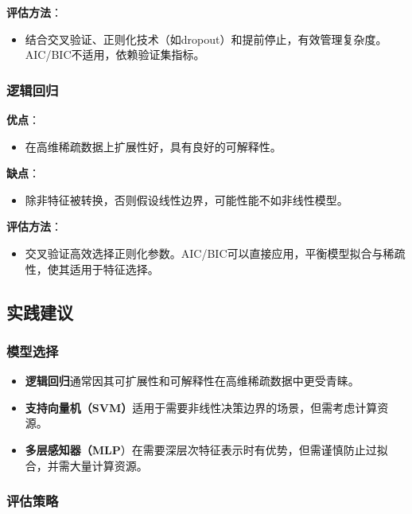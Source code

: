 \documentclass[11pt,a4paper]{article}
\begin{document}
\textbf{评估方法}：
\begin{itemize}
    \item 结合交叉验证、正则化技术（如dropout）和提前停止，有效管理复杂度。AIC/BIC不适用，依赖验证集指标。
\end{itemize}

\subsubsection{逻辑回归}

\textbf{优点}：
\begin{itemize}
    \item 在高维稀疏数据上扩展性好，具有良好的可解释性。
\end{itemize}

\textbf{缺点}：
\begin{itemize}
    \item 除非特征被转换，否则假设线性边界，可能性能不如非线性模型。
\end{itemize}

\textbf{评估方法}：
\begin{itemize}
    \item 交叉验证高效选择正则化参数。AIC/BIC可以直接应用，平衡模型拟合与稀疏性，使其适用于特征选择。
\end{itemize}

\subsection{实践建议}

\subsubsection{模型选择}

\begin{itemize}
    \item \textbf{逻辑回归}通常因其可扩展性和可解释性在高维稀疏数据中更受青睐。
    \item \textbf{支持向量机（SVM）}适用于需要非线性决策边界的场景，但需考虑计算资源。
    \item \textbf{多层感知器（MLP}）在需要深层次特征表示时有优势，但需谨慎防止过拟合，并需大量计算资源。
\end{itemize}

\subsubsection{评估策略}
\end{document}
